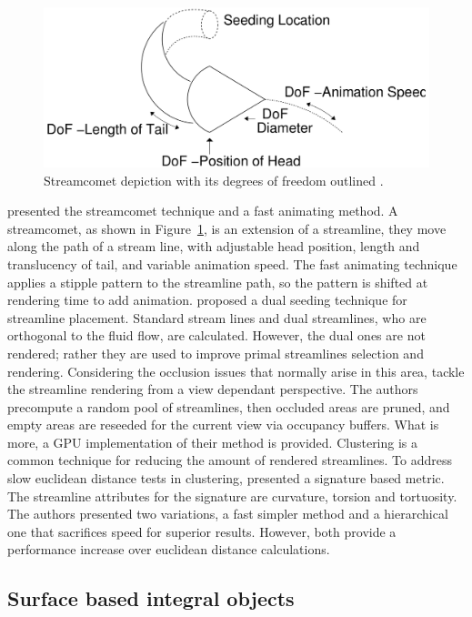 \begin{figure}[htbp]
	\centering
	\includegraphics[scale=.2]{images/streamComet}
	\caption{Streamcomet depiction with its degrees of freedom outlined \cite{Laramee2005}.}
	\label{fig:streamComent}
\end{figure}

\cite{Laramee2005} presented the streamcomet technique and a fast animating method.
A streamcomet, as shown in Figure~\ref{fig:streamComent}, is an extension of a streamline, they move along the path of a stream line, with adjustable head position, length and translucency of tail, and variable animation speed.
The fast animating technique applies a stipple pattern to the streamline path, so the pattern is shifted at rendering time to add animation.
\cite{Rosanwo2009} proposed a dual seeding technique for streamline placement.
Standard stream lines and dual streamlines, who are orthogonal to the fluid flow, are calculated.
However, the dual ones are not rendered; rather they are used to improve primal streamlines selection and rendering.
Considering the occlusion issues that normally arise in this area, \cite{Marchesin2010} tackle the streamline rendering from a view dependant perspective.
The authors precompute a random pool of streamlines, then occluded areas are pruned, and empty areas are reseeded for the current view via occupancy buffers.
What is more, a GPU implementation of their method is provided.
Clustering is a common technique for reducing the amount of rendered streamlines.
To address slow euclidean distance tests in clustering, \cite{McLoughlin2013} presented a signature based metric.
The streamline attributes for the signature are curvature, torsion and tortuosity.
The authors presented two variations, a fast simpler method and a hierarchical one that sacrifices speed for superior results.
However, both provide a performance increase over euclidean distance calculations.

\subsection{Surface based integral objects}

